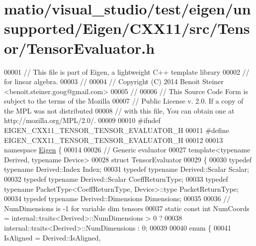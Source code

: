 \hypertarget{matio_2visual__studio_2test_2eigen_2unsupported_2_eigen_2_c_x_x11_2src_2_tensor_2_tensor_evaluator_8h_source}{}\section{matio/visual\+\_\+studio/test/eigen/unsupported/\+Eigen/\+C\+X\+X11/src/\+Tensor/\+Tensor\+Evaluator.h}
\label{matio_2visual__studio_2test_2eigen_2unsupported_2_eigen_2_c_x_x11_2src_2_tensor_2_tensor_evaluator_8h_source}

\begin{DoxyCode}
00001 \textcolor{comment}{// This file is part of Eigen, a lightweight C++ template library}
00002 \textcolor{comment}{// for linear algebra.}
00003 \textcolor{comment}{//}
00004 \textcolor{comment}{// Copyright (C) 2014 Benoit Steiner <benoit.steiner.goog@gmail.com>}
00005 \textcolor{comment}{//}
00006 \textcolor{comment}{// This Source Code Form is subject to the terms of the Mozilla}
00007 \textcolor{comment}{// Public License v. 2.0. If a copy of the MPL was not distributed}
00008 \textcolor{comment}{// with this file, You can obtain one at http://mozilla.org/MPL/2.0/.}
00009 
00010 \textcolor{preprocessor}{#ifndef EIGEN\_CXX11\_TENSOR\_TENSOR\_EVALUATOR\_H}
00011 \textcolor{preprocessor}{#define EIGEN\_CXX11\_TENSOR\_TENSOR\_EVALUATOR\_H}
00012 
00013 \textcolor{keyword}{namespace }\hyperlink{namespace_eigen}{Eigen} \{
00014 
00026 \textcolor{comment}{// Generic evaluator}
00027 \textcolor{keyword}{template}<\textcolor{keyword}{typename} Derived, \textcolor{keyword}{typename} Device>
00028 \textcolor{keyword}{struct }TensorEvaluator
00029 \{
00030   \textcolor{keyword}{typedef} \textcolor{keyword}{typename} Derived::Index Index;
00031   \textcolor{keyword}{typedef} \textcolor{keyword}{typename} Derived::Scalar Scalar;
00032   \textcolor{keyword}{typedef} \textcolor{keyword}{typename} Derived::Scalar CoeffReturnType;
00033   \textcolor{keyword}{typedef} \textcolor{keyword}{typename} PacketType<CoeffReturnType, Device>::type PacketReturnType;
00034   \textcolor{keyword}{typedef} \textcolor{keyword}{typename} Derived::Dimensions Dimensions;
00035 
00036   \textcolor{comment}{// NumDimensions is -1 for variable dim tensors}
00037   \textcolor{keyword}{static} \textcolor{keyword}{const} \textcolor{keywordtype}{int} NumCoords = internal::traits<Derived>::NumDimensions > 0 ?
00038                                internal::traits<Derived>::NumDimensions : 0;
00039 
00040   \textcolor{keyword}{enum} \{
00041     IsAligned = Derived::IsAligned,

\end{DoxyCode}
